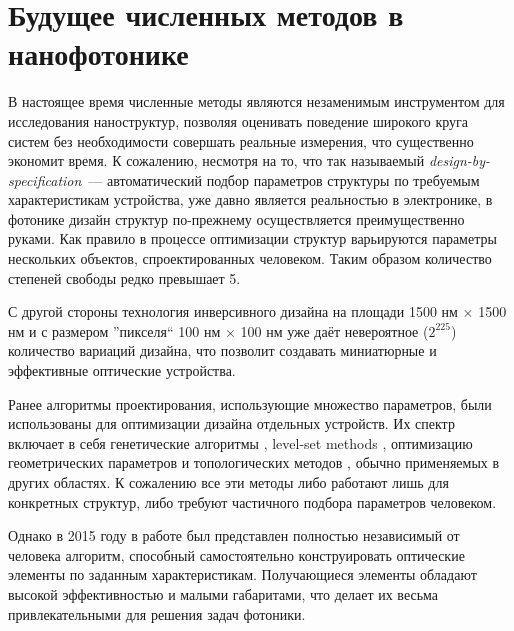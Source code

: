 \section{Будущее численных методов в нанофотонике}

В настоящее время численные методы являются незаменимым инструментом для исследования наноструктур, позволяя оценивать поведение широкого круга систем без необходимости совершать реальные измерения, что существенно экономит время. К сожалению, несмотря на то, что  так называемый {\it design-by-specification}~--- автоматический подбор параметров структуры по требуемым характеристикам устройства, уже давно является реальностью в электронике, в фотонике дизайн структур по-прежнему осуществляется преимущественно руками. Как правило в процессе оптимизации структур варьируются параметры нескольких объектов, спроектированных человеком. Таким образом количество степеней свободы редко превышает 5.

С другой стороны технология инверсивного дизайна на площади 1500 нм $\times$ 1500 нм и с размером ''пикселя`` 100 нм $\times$ 100 нм уже даёт невероятное ($2^{225}$) количество вариаций дизайна, что позволит создавать миниатюрные и эффективные оптические устройства.

Ранее алгоритмы проектирования, использующие множество параметров, были использованы для оптимизации дизайна отдельных устройств. Их спектр включает в себя генетические алгоритмы \cite{Gondarenko2008}, level-set methods \cite{Kao2005}, оптимизацию геометрических параметров \cite{Seliger2006} и топологических методов \cite{Elesin2012}, обычно применяемых в других областях. К сожалению все эти методы либо работают лишь для конкретных структур, либо требуют частичного подбора параметров человеком. 

Однако в 2015 году в работе \cite{Piggott2015} был представлен полностью независимый от человека алгоритм, способный самостоятельно конструировать оптические элементы по заданным характеристикам. Получающиеся элементы обладают высокой эффективностью и малыми габаритами, что делает их весьма привлекательными для решения задач фотоники.